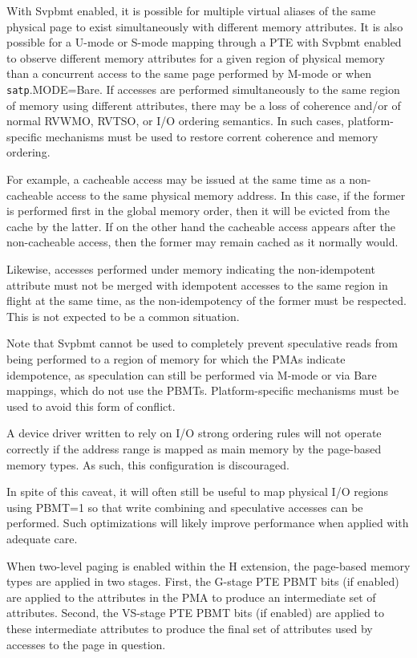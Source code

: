 With Svpbmt enabled, it is possible for multiple virtual aliases of the same
physical page to exist simultaneously with different memory attributes.  It is
also possible for a U-mode or S-mode mapping through a PTE with Svpbmt enabled
to observe different memory attributes for a given region of physical memory
than a concurrent access to the same page performed by M-mode or when {\tt
satp}.MODE=Bare.  If accesses are performed simultaneously to the same region
of memory using different attributes, there may be a loss of coherence and/or
of normal RVWMO, RVTSO, or I/O ordering semantics.  In such cases,
platform-specific mechanisms must be used to restore corrent coherence and
memory ordering.

\begin{commentary}
For example, a cacheable access may be issued at the same time as a
non-cacheable access to the same physical memory address.  In this case,
if the former is performed first in the global memory order, then it will
be evicted from the cache by the latter.  If on the other hand the cacheable
access appears after the non-cacheable access, then the former may remain
cached as it normally would.

Likewise, accesses performed under memory indicating the non-idempotent
attribute must not be merged with idempotent accesses to the same region
in flight at the same time, as the non-idempotency of the former must
be respected.  This is not expected to be a common situation.

Note that Svpbmt cannot be used to completely prevent speculative reads from
being performed to a region of memory for which the PMAs indicate idempotence,
as speculation can still be performed via M-mode or via Bare mappings, which do
not use the PBMTs.  Platform-specific mechanisms must be used to avoid this
form of conflict.
\end{commentary}

\begin{commentary}
A device driver written to rely on I/O strong ordering rules will not
operate correctly if the address range is mapped as main memory by the
page-based memory types.  As such, this configuration is discouraged.

In spite of this caveat, it will often still be useful to map physical I/O
regions using PBMT=1 so that write combining and speculative accesses can be
performed.  Such optimizations will likely improve performance when applied
with adequate care.
\end{commentary}

When two-level paging is enabled within the H extension, the page-based memory
types are applied in two stages.  First, the G-stage PTE PBMT bits (if enabled)
are applied to the attributes in the PMA to produce an intermediate set of
attributes.  Second, the VS-stage PTE PBMT bits (if enabled) are applied to
these intermediate attributes to produce the final set of attributes used by
accesses to the page in question.
